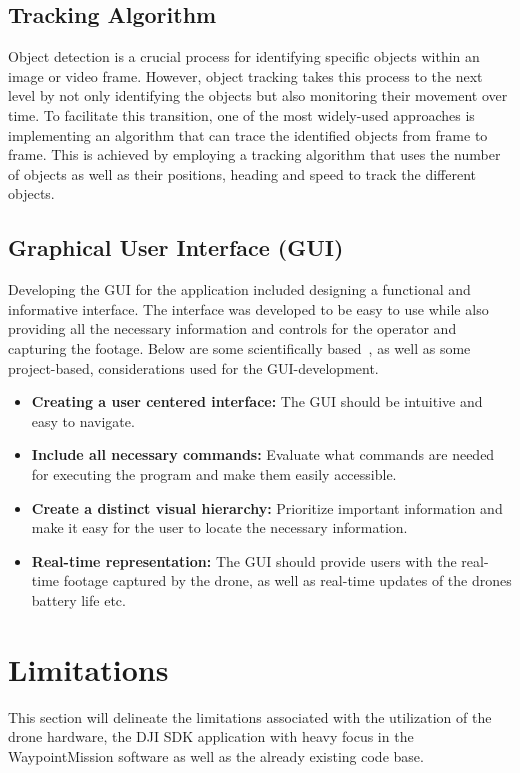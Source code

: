 \subsection{Tracking Algorithm} \label{Tracking algorithm}

Object detection is a crucial process for identifying specific objects within an image or video frame. However, object tracking takes this process to the next level by not only identifying the objects but also monitoring their movement over time. To facilitate this transition, one of the most widely-used approaches is implementing an algorithm that can trace the identified objects from frame to frame. This is achieved by employing a tracking algorithm that uses the number of objects as well as their positions, heading and speed to track the different objects.

\subsection{Graphical User Interface (GUI)}\label{GUI}
Developing the GUI for the application included designing a functional and informative interface. The interface was developed to be easy to use while also providing all the necessary information and controls for the operator and capturing the footage. Below are some scientifically based~\cite{AntchevaGUIDELINESGUI}, as well as some project-based, considerations used for the GUI-development. 
\\

\begin{itemize}
    \item \textbf{Creating a user centered interface:} The GUI should be intuitive and easy to navigate. 
    \item \textbf{Include all necessary commands:} Evaluate what commands are needed for executing the program and make them easily accessible. 
    \item \textbf{Create a distinct visual hierarchy:} Prioritize important information and make it easy for the user to locate the necessary information. 
    \item \textbf{Real-time representation:} The GUI should provide users with the real-time footage captured by the drone, as well as real-time updates of the drones battery life etc. 
    
\end{itemize}

\section{Limitations} \label{Limitations}
This section will delineate the limitations associated with the utilization of the drone hardware, the DJI SDK application with heavy focus in the WaypointMission software as well as the already existing code base. 

